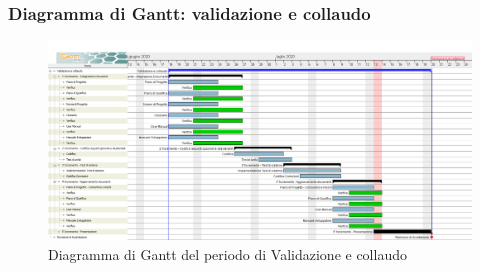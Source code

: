 	\subsubsection{Diagramma di Gantt: validazione e collaudo}
		\begin{figure}[h]
			\centering
			\includegraphics[width=1.1\textwidth]{./res/img/DiagrammiGantt/validaz_gantt.png}
			\caption{Diagramma di Gantt del periodo di Validazione e collaudo}
		\end{figure}
